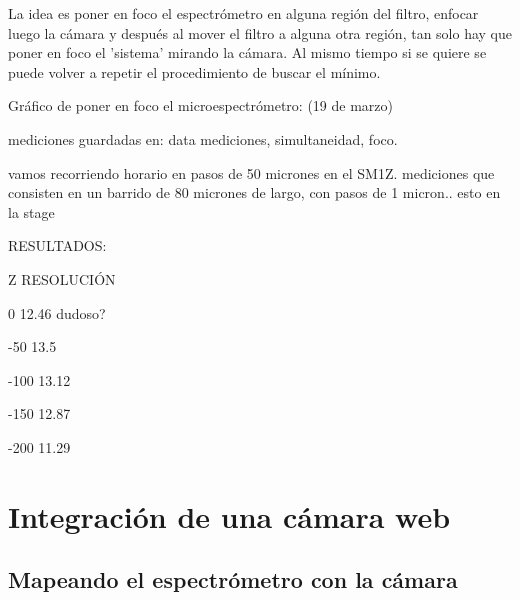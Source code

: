 La idea es poner en foco el espectrómetro en alguna región del filtro, enfocar luego la cámara y después al mover el filtro a alguna otra región, tan solo hay que poner en foco el 'sistema' mirando la cámara. Al mismo tiempo si se quiere se puede volver a repetir el procedimiento de buscar el mínimo.


Gráfico de poner en foco el microespectrómetro: (19 de marzo)

mediciones guardadas en: data mediciones, simultaneidad, foco.

vamos recorriendo horario en pasos de 50 micrones en el SM1Z.
mediciones que consisten en un barrido de 80 micrones de largo, con pasos de 1 micron.. esto en la stage


RESULTADOS:

Z                  RESOLUCIÓN

0                  12.46 dudoso?

-50               13.5

-100             13.12

-150              12.87

-200              11.29



\singlespacing
\section*{Integración de una cámara web}

\singlespacing
\subsection*{Mapeando el espectrómetro con la cámara}
